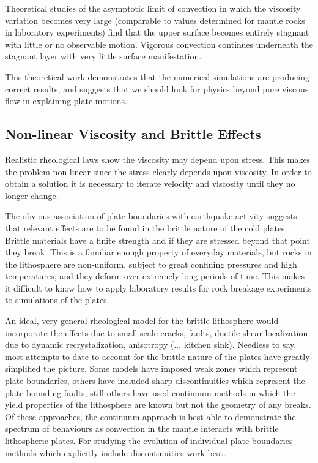 \documentclass[10pt]{article}
\begin{document}
		Theoretical studies of the asymptotic limit of convection in which the viscosity variation 
		becomes very large (comparable to values determined for mantle rocks in 
		laboratory experiments) find that the upper surface becomes entirely stagnant with 
		little or no observable motion. Vigorous convection continues underneath the stagnant layer
		with very little surface manifestation. 

		This theoretical work demonstrates that the 
		numerical simulations are producing correct results, and suggests that we should look
		for physics beyond pure viscous flow in explaining plate motions.
		
		
	\subsection{Non-linear Viscosity and Brittle Effects}	
	
		Realistic rheological laws show the viscosity may depend
		upon stress. This makes the problem non-linear since the
		stress clearly depends upon viscosity.
		In order to obtain a solution it is necessary to iterate
		velocity and viscosity until they no longer change.
		
		The obvious association of plate boundaries with earthquake activity suggests 
	that relevant effects are to be found in the brittle nature of the cold plates. Brittle
	materials have a finite strength and if they are stressed beyond that point they break. This
	is a familiar enough property of everyday materials, but rocks in the lithosphere are non-uniform, 
	subject to great confining pressures and high temperatures, and they deform over extremely long
	periods of time. This makes it difficult to know how to apply laboratory results for rock
	breakage experiments to simulations of the plates.

	An ideal, very general rheological model for the brittle lithosphere would incorporate the effects
	due to small-scale cracks, faults, ductile shear localization due to dynamic recrystalization, 
	anisotropy (... kitchen sink). Needless to say, most attempts to date to account for the
	brittle nature of the plates have greatly simplified the picture. Some models have imposed weak
	zones which represent plate boundaries, others have included sharp discontinuities which represent
	the plate-bounding faults, still others have used continuum methods in which the yield properties
	of the lithosphere are known but not the geometry of any breaks.
	Of these approaches, the continuum approach is best able to demonstrate the spectrum of
	behaviours as convection in the mantle interacts with brittle lithospheric plates. For studying
	the evolution of individual plate boundaries  methods which explicitly include 
	discontinuities work best.
	
\end{document}
